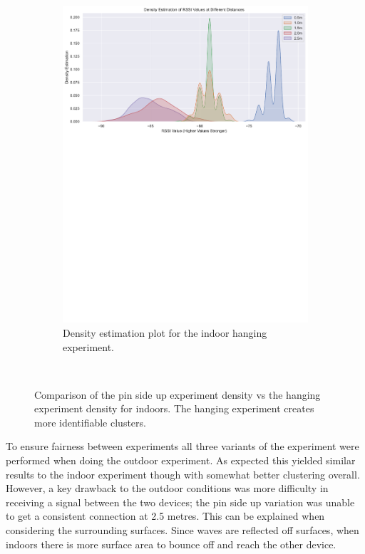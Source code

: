 \documentclass{l4proj}
\begin{document}
\begin{figure}[!htb]
\begin{subfigure}[b]{0.45\textwidth}
        \includegraphics[width=\textwidth]{images/indoor_hanging_rssi_density.pdf}
        \caption{ Density estimation plot for the indoor hanging experiment. }
        \label{fig:indoor_hanging_density}
    \end{subfigure}
    ~ %
    \caption{ Comparison of the pin side up experiment density  vs the hanging experiment density for indoors. The hanging experiment creates more identifiable clusters. }
    \label{fig:initial_plots}
\end{figure}

To ensure fairness between experiments all three variants of the experiment were performed when doing the outdoor experiment. As expected this yielded similar results to the indoor experiment though with somewhat better clustering overall. However, a key drawback to the outdoor conditions was more difficulty in receiving a signal between the two devices; the pin side up variation was unable to get a consistent connection at 2.5 metres. This can be explained when considering the surrounding surfaces. Since waves are reflected off surfaces, when indoors there is more surface area to bounce off and reach the other device.
\end{document}
